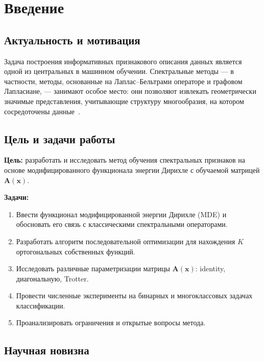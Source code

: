 \documentclass[14pt, a4paper, oneside]{extreport}
\theoremstyle{plain}
\theoremstyle{definition}
\begin{document}
\chapter{Введение}
\label{ch:intro}

\section{Актуальность и мотивация}

Задача построения информативных признакового описания данных является одной из центральных в машинном обучении.
Спектральные методы — в частности, методы, основанные на Лаплас--Бельтрами операторе и графовом Лапласиане, — занимают особое место: они позволяют извлекать геометрически значимые представления, учитывающие структуру многообразия, на котором сосредоточены данные~\cite{Belkin2003}.


\section{Цель и задачи работы}

\textbf{Цель:} разработать и исследовать метод обучения спектральных признаков на основе модифицированного функционала энергии Дирихле с обучаемой матрицей $\mathbf{A}(\mathbf{x})$.

\textbf{Задачи:}
\begin{enumerate}
  \item Ввести функционал модифицированной энергии Дирихле (MDE) и обосновать его связь с классическими спектральными операторами.
  \item Разработать алгоритм последовательной оптимизации для нахождения $K$ ортогональных собственных функций.
  \item Исследовать различные параметризации матрицы $\mathbf{A}(\mathbf{x})$: identity, диагональную, Trotter.
  \item Провести численные эксперименты на бинарных и многоклассовых задачах классификации.
  \item Проанализировать ограничения и открытые вопросы метода.
\end{enumerate}

\section{Научная новизна}
\end{document}
